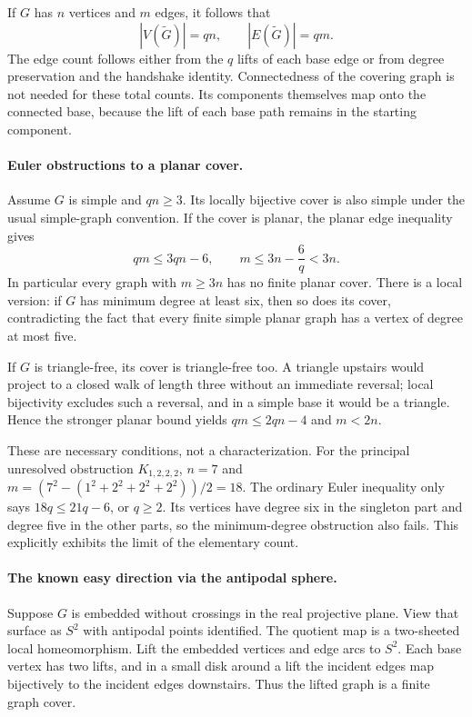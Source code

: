 \documentclass[11pt,a4paper]{article}
\begin{document}
If $G$ has $n$ vertices and $m$ edges, it follows that
\[
|V(\widetilde G)|=qn,\qquad |E(\widetilde G)|=qm.
\]
The edge count follows either from the $q$ lifts of each base edge or from degree preservation and the handshake identity. Connectedness of the covering graph is not needed for these total counts. Its components themselves map onto the connected base, because the lift of each base path remains in the starting component.

\paragraph{Euler obstructions to a planar cover.}
Assume $G$ is simple and $qn\ge3$. Its locally bijective cover is also simple under the usual simple-graph convention. If the cover is planar, the planar edge inequality gives
\[
qm\le3qn-6,\qquad m\le3n-\frac6q<3n.
\]
In particular every graph with $m\ge3n$ has no finite planar cover. There is a local version: if $G$ has minimum degree at least six, then so does its cover, contradicting the fact that every finite simple planar graph has a vertex of degree at most five.

If $G$ is triangle-free, its cover is triangle-free too. A triangle upstairs would project to a closed walk of length three without an immediate reversal; local bijectivity excludes such a reversal, and in a simple base it would be a triangle. Hence the stronger planar bound yields $qm\le2qn-4$ and $m<2n$.

These are necessary conditions, not a characterization. For the principal unresolved obstruction $K_{1,2,2,2}$, $n=7$ and $m=(7^2-(1^2+2^2+2^2+2^2))/2=18$. The ordinary Euler inequality only says $18q\le21q-6$, or $q\ge2$. Its vertices have degree six in the singleton part and degree five in the other parts, so the minimum-degree obstruction also fails. This explicitly exhibits the limit of the elementary count.

\paragraph{The known easy direction via the antipodal sphere.}
Suppose $G$ is embedded without crossings in the real projective plane. View that surface as $S^2$ with antipodal points identified. The quotient map is a two-sheeted local homeomorphism. Lift the embedded vertices and edge arcs to $S^2$. Each base vertex has two lifts, and in a small disk around a lift the incident edges map bijectively to the incident edges downstairs. Thus the lifted graph is a finite graph cover.
\end{document}
